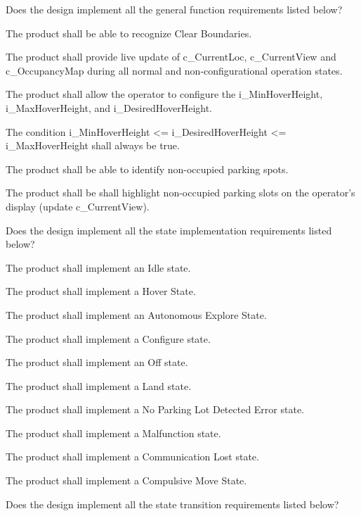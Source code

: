 \documentclass[12pt, titlepage]{article}
\begin{document}
\begin{todolist}
\label{Design1_Checklist}
\item Does the design implement all the general function requirements listed below?
\begin{todolist}
    \item The product shall be able to recognize Clear Boundaries.
    \item The product shall provide live update of c\_CurrentLoc, c\_CurrentView and c\_OccupancyMap during all normal and non-configurational operation states.
    \item The product shall allow the operator to configure the i\_MinHoverHeight, i\_MaxHoverHeight, and i\_DesiredHoverHeight.
    \item The condition i\_MinHoverHeight <= i\_DesiredHoverHeight <= i\_MaxHoverHeight shall always be true.
    \item The product shall be able to identify non-occupied parking spots.
    \item The product shall be shall highlight non-occupied parking slots on the operator's display (update c_CurrentView).
\end{todolist}
\item Does the design implement all the state implementation requirements listed below?
\begin{todolist}
    \item The product shall implement an Idle state.
    \item The product shall implement a Hover State.
    \item The product shall implement an Autonomous Explore State.
    \item The product shall implement a Configure state.
    \item The product shall implement an Off state.
    \item The product shall implement a Land state.
    \item The product shall implement a No Parking Lot Detected Error state.
    \item The product shall implement a Malfunction state.
    \item The product shall implement a Communication Lost state.
    \item The product shall implement a Compulsive Move State.
\end{todolist}
\item Does the design implement all the state transition requirements listed below?
\begin{todolist}

\end{todolist}
\end{todolist}
\end{document}

